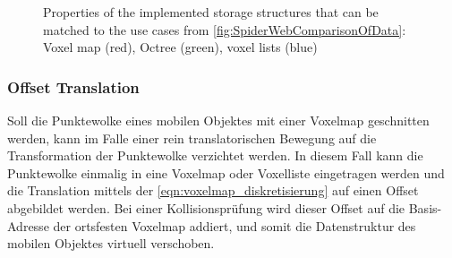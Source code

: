 \begin{figure}[h]
 \centering
  \caption{Properties of the implemented storage structures that can be matched to the use cases from \cref{fig:SpiderWebComparisonOfData}:
  Voxel map (red), Octree (green), voxel lists (blue)}
  \label{fig:spiderweb}
\end{figure}



\subsubsection{Offset Translation}
\label{subsec:offset_translation}
Soll die Punktewolke eines mobilen Objektes mit einer Voxelmap geschnitten werden, kann im Falle einer rein translatorischen Bewegung auf die Transformation der Punktewolke verzichtet werden.
In diesem Fall kann die Punktewolke einmalig in eine Voxelmap oder Voxelliste eingetragen werden und die Translation mittels der \cref{eqn:voxelmap_diskretisierung} auf einen Offset abgebildet werden.
Bei einer Kollisionsprüfung wird dieser Offset auf die Basis-Adresse der ortsfesten Voxelmap addiert, und somit die Datenstruktur des mobilen Objektes virtuell verschoben.

